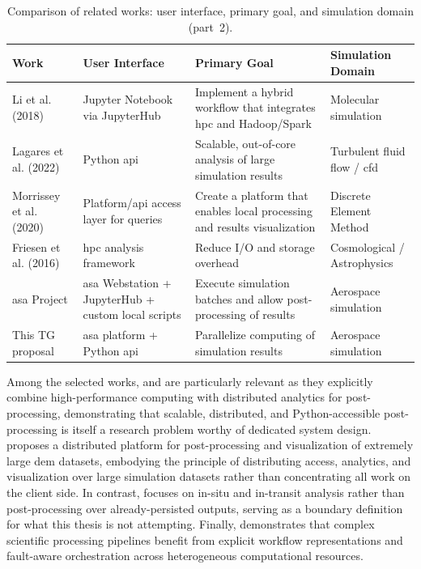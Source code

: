 \begin{table}[htbp]
    \centering
    \caption{Comparison of related works: user interface, primary goal, and simulation domain (part~2).}
    \label{tab:processing_paradigms_b}
    \small
    \begin{tabularx}{\linewidth}{l >{\raggedright\arraybackslash}X >{\raggedright\arraybackslash}X >{\raggedright\arraybackslash}X}
        \toprule
        Work & User Interface & Primary Goal & Simulation Domain \\
        \midrule
        Li et al. (2018) & Jupyter Notebook via JupyterHub & Implement a hybrid workflow that integrates \gls{hpc} and Hadoop/Spark & Molecular simulation \\
        \addlinespace
        Lagares et al. (2022) & Python \gls{api} & Scalable, out-of-core analysis of large simulation results & Turbulent fluid flow / \gls{cfd} \\
        \addlinespace
        Morrissey et al. (2020) & Platform/\gls{api} access layer for queries & Create a platform that enables local processing and results visualization & Discrete Element Method \\
        \addlinespace
        Friesen et al. (2016) & \gls{hpc} analysis framework & Reduce I/O and storage overhead & Cosmological / Astrophysics \\
        \addlinespace
        \gls{asa} Project & \gls{asa} Webstation + JupyterHub + custom local scripts & Execute simulation batches and allow post-processing of results & Aerospace simulation \\
        \addlinespace
        This TG proposal & \gls{asa} platform + Python \gls{api} & Parallelize computing of simulation results & Aerospace simulation \\
        \bottomrule
    \end{tabularx}
\end{table}

Among the selected works, \textcite{li2018postprocessing} and \textcite{lagares2022aquila} are particularly relevant as they explicitly combine high-performance computing with distributed analytics for post-processing, demonstrating that scalable, distributed, and Python-accessible post-processing is itself a research problem worthy of dedicated system design. \textcite{morrissey2020velassco} proposes a distributed platform for post-processing and visualization of extremely large \gls{dem} datasets, embodying the principle of distributing access, analytics, and visualization over large simulation datasets rather than concentrating all work on the client side. In contrast, \textcite{friesen2016insitu} focuses on in-situ and in-transit analysis rather than post-processing over already-persisted outputs, serving as a boundary definition for what this thesis is not attempting. Finally, \textcite{deelman2015pegasus} demonstrates that complex scientific processing pipelines benefit from explicit workflow representations and fault-aware orchestration across heterogeneous computational resources.

